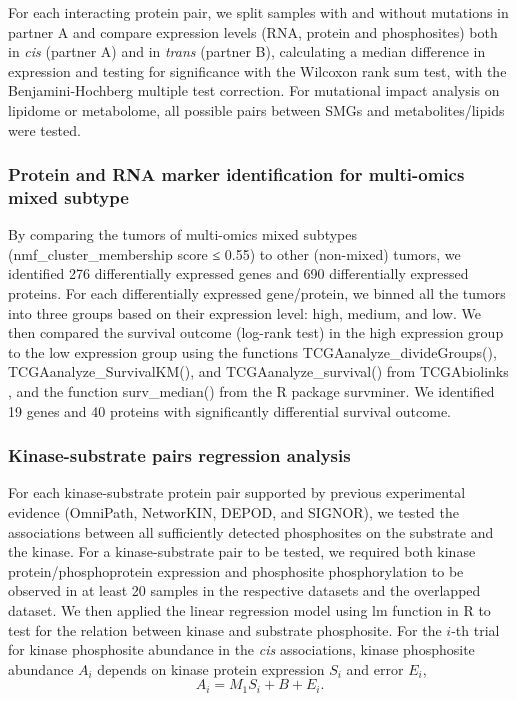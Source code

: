 For each interacting protein pair, we split samples with and without mutations in partner A and compare expression levels (RNA, protein and phosphosites) both in \textit{cis} (partner A) and in \textit{trans} (partner B), calculating a median difference in expression and testing for significance with the Wilcoxon rank sum test, with the Benjamini-Hochberg multiple test correction. For mutational impact analysis on lipidome or metabolome, all possible pairs between SMGs and metabolites/lipids were tested.

\subsubsection{Protein and RNA marker identification for multi-omics mixed subtype}
By comparing the tumors of multi-omics mixed subtypes (nmf\_cluster\_membership score ≤ 0.55) to other (non-mixed) tumors, we identified 276 differentially expressed genes and 690 differentially expressed proteins. For each differentially expressed gene/protein, we binned all the tumors into three groups based on their expression level: high, medium, and low. We then compared the survival outcome (log-rank test) in the high expression group to the low expression group using the functions TCGAanalyze\_divideGroups(), TCGAanalyze\_SurvivalKM(), and TCGAanalyze\_survival() from TCGAbiolinks \cite{colapricoa_noushmehrh:TCGAbiolinksBioconductor2016}, and the function surv\_median() from the R package survminer. We identified 19 genes and 40 proteins with significantly differential survival outcome.



\subsubsection{Kinase-substrate pairs regression analysis}
For each kinase-substrate protein pair supported by previous experimental evidence (OmniPath, NetworKIN, DEPOD, and SIGNOR), we tested the associations between all sufficiently detected phosphosites on the substrate and the kinase. For a kinase-substrate pair to be tested, we required both kinase protein/phosphoprotein expression and phosphosite phosphorylation to be observed in at least 20 samples in the respective datasets and the overlapped dataset. We then applied the linear regression model using lm function in R to test for the relation between kinase and substrate phosphosite. For the $i$-th trial for kinase phosphosite abundance in the \textit{cis} associations, kinase phosphosite abundance $A_i$ depends on kinase protein expression $S_i$ and error $E_i$,
\[
    A_i = M_1S_i + B + E_i.
\]

